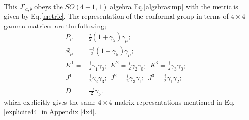 \documentclass[aps,reprint,notitlepage,nofootinbib,superscriptaddress]{revtex4-1}
\begin{document}
This $J'_{a,b}$ obeys the $SO(4+1,1)$ algebra Eq.\eqref{algebrasimp} with the metric is given by Eq.\eqref{metric}. The representation of the conformal group in terms of $4\times4$ gamma matrices are the following;
\begin{align}
    P_\mu=&\frac{i}{2}(1+\gamma_5)\gamma_\mu;\\
    \mathfrak{K}_\mu=&\frac{-i}{2}(1-\gamma_5)\gamma_\mu;\\
    K^1=&\frac{i}{2}\gamma_1\gamma_0;~~K^2=\frac{i}{2}\gamma_2\gamma_0;~~K^3=\frac{i}{2}\gamma_3\gamma_0;\\
    J^1=&\frac{i}{2}\gamma_2\gamma_3;~~J^2=\frac{i}{2}\gamma_3\gamma_1;~~J^3=\frac{i}{2}\gamma_1\gamma_2;\\
    D=&\frac{-i}{2}\gamma_5.
\end{align}
which explicitly gives the same $4\times4$ matrix representations mentioned in Eq.\eqref{explicite44}  in Appendix \ref{4x4}.
\end{document}
